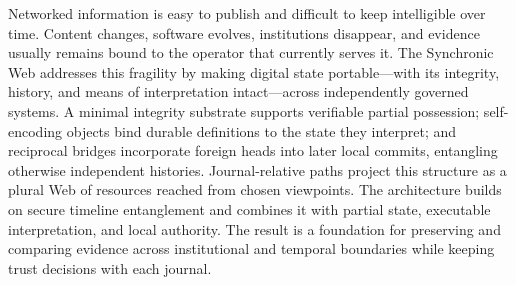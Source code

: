 Networked information is easy to publish and difficult to keep intelligible over time. Content changes, software evolves, institutions disappear, and evidence usually remains bound to the operator that currently serves it. The Synchronic Web addresses this fragility by making digital state portable---with its integrity, history, and means of interpretation intact---across independently governed systems. A minimal integrity substrate supports verifiable partial possession; self-encoding objects bind durable definitions to the state they interpret; and reciprocal bridges incorporate foreign heads into later local commits, entangling otherwise independent histories. Journal-relative paths project this structure as a plural Web of resources reached from chosen viewpoints. The architecture builds on secure timeline entanglement and combines it with partial state, executable interpretation, and local authority. The result is a foundation for preserving and comparing evidence across institutional and temporal boundaries while keeping trust decisions with each journal.